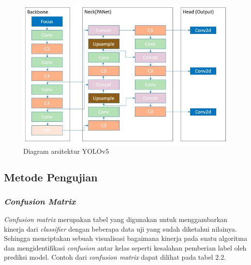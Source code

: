 \begin{figure}[ht]
  \centering
  \includegraphics[scale=0.8]{gambar/arsitektur_yolov5.jpg}
  \caption{Diagram arsitektur YOLOv5}
  \label{fig:diagramyolov5}
\end{figure}

\subsection{Metode Pengujian}
\label{sec:metode-pengujian}

\subsubsection{\emph{Confusion Matrix}}
\label{subsec:confusion-matrix}

\emph{Confusion matrix} merupakan tabel yang digunakan untuk menggambarkan kinerja dari \emph{classifier} dengan beberapa data uji
yang sudah diketahui nilainya. Sehingga menciptakan sebuah visualisasi bagaimana kinerja pada suatu algoritma dan mengidentifikasi
\emph{confusion} antar kelas seperti kesalahan pemberian label oleh prediksi model. Contoh
dari \emph{confusion matrix} dapat dilihat pada tabel 2.2.

